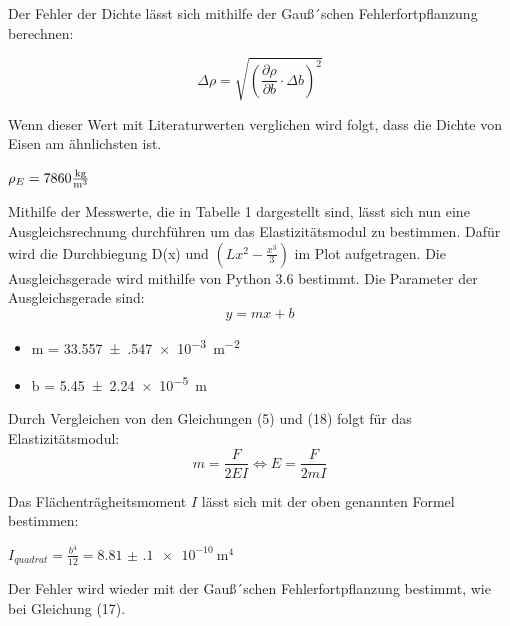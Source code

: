 Der Fehler der Dichte lässt sich mithilfe der Gauß´schen Fehlerfortpflanzung berechnen:

\begin{equation}
  \Delta \rho = \sqrt{\left(\frac{\partial\rho}{\partial b} \cdot \Delta b \right)^2}
\end{equation}

Wenn dieser Wert mit Literaturwerten verglichen wird folgt, dass die Dichte von Eisen
am ähnlichsten ist.\\
\centerline{$\rho_{E} = 7860 \si[per-mode=fraction]{\kilo\gram\per\metre\tothe{3}}$}


Mithilfe der Messwerte, die in Tabelle 1 dargestellt sind, lässt sich nun eine
Ausgleichsrechnung durchführen um das Elastizitätsmodul zu bestimmen. Dafür wird die
Durchbiegung D(x) und $\left( Lx^2- \frac{x^3}{3} \right)$ im Plot aufgetragen.
Die Ausgleichsgerade wird mithilfe von Python 3.6 bestimmt.
Die Parameter der Ausgleichsgerade sind:\\

\begin{equation}
  y=mx+b
\end{equation}

\begin{itemize}
  \item m = \SI{33.557(547)e-3}{\meter\tothe{-2}}
  \item b = \SI{5.45(224)e-5}{\meter}
\end{itemize}

Durch Vergleichen von den Gleichungen (5) und (18) folgt für das Elastizitätsmodul:\\

\begin{equation}
  m = \frac{F}{2EI} \iff E= \frac{F}{2mI}
\end{equation}

Das Flächenträgheitsmoment $I$ lässt sich mit der oben genannten Formel bestimmen:\\

\centerline{$I_{quadrat} = \frac{b^4}{12} = \SI{8.81(10)e-10}{\meter\tothe{4}}$}

Der Fehler wird wieder mit der Gauß´schen Fehlerfortpflanzung bestimmt, wie bei Gleichung (17).\\

